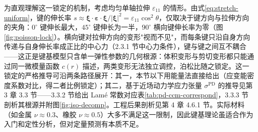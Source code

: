 为直观理解这一锁定的机制，考虑均匀单轴拉伸 $\varepsilon_{11}$ 的情形。由式\eqref{eq:stretch-uniform}，键的伸长率 $s\approx\boldsymbol{\xi}\cdot\boldsymbol{\varepsilon}\cdot\boldsymbol{\xi}/|\boldsymbol{\xi}|^2=\varepsilon_{11}\cos^2\theta$，仅取决于键方向与拉伸方向的夹角：$0^\circ$ 键伸长最大，$45^\circ$ 键伸长为一半，$90^\circ$ 横向键伸长率为零（图\ref{fig:poisson-lock}）。横向键对拉伸方向的变形"视而不见"，而每条键只沿自身方向传递与自身伸长率成正比的中心力（2.3.1 节中心力条件），键与键之间互不耦合——这正是键基模型只含单一弹性参数的几何根源：体积变形与剪切变形都只能通过同一微模量函数 $c(r)$ 描述，两类变形无法独立调控，泊松比随之锁定。这一锁定的严格推导可沿两条路径展开：其一，本节以下用能量法直接给出（应变能密度系数对比，得二者比例锁定）；其二，基于近场动力学应力张量 $\sigma^{\mathrm{PD}}$ 的推导见第 3 章 3.3 节——3.3.2 节给出 Lam\'e 常数对应表\ref{tab:pd-ccm-correspond}，3.3.3 节剖析其根源并附图\ref{fig:iso-decomp}。工程后果剖析见第 4 章 4.6.1 节。实际材料（如金属 $\nu\approx 0.3$、橡胶 $\nu\approx 0.5$）大多不满足这一限制，因此键基理论虽适合作为入门和定性分析，但对定量预测有本质不足。

